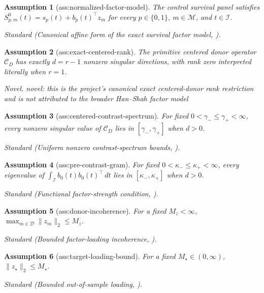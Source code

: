 \documentclass{article}
\newtheorem{assumption}{Assumption}
\begin{document}
\begin{assumption}[ass:normalized-factor-model]\label{ass:normalized-factor-model}
The control survival panel satisfies \(S^0_{p,m}(t)=s_p(t)+b_p(t)^\top z_m\) for every \(p\in\{0,1\}\), \(m\in\mathcal M\), and \(t\in\mathcal I\).
\par\smallskip\noindent\emph{Standard} (Canonical affine form of the exact survival factor model, \cite{HanShah2025SSC}).
\end{assumption}

\begin{assumption}[ass:exact-centered-rank]\label{ass:exact-centered-rank}
The primitive centered donor operator \(\mathcal C_D\) has exactly \(d=r-1\) nonzero singular directions, with rank zero interpreted literally when \(r=1\).
\par\smallskip\noindent\emph{Novel.} novel: this is the project's canonical exact centered-donor rank restriction and is not attributed to the broader Han--Shah factor model
\end{assumption}

\begin{assumption}[ass:centered-contrast-spectrum]\label{ass:centered-contrast-spectrum}
For fixed \(0<\gamma_-\le\gamma_+<\infty\), every nonzero singular value of \(\mathcal C_D\) lies in \([\gamma_-,\gamma_+]\) when \(d>0\).
\par\smallskip\noindent\emph{Standard} (Uniform nonzero contrast-spectrum bounds, \cite{AgarwalShahShen2025PCR}).
\end{assumption}

\begin{assumption}[ass:pre-contrast-gram]\label{ass:pre-contrast-gram}
For fixed \(0<\kappa_-\le\kappa_+<\infty\), every eigenvalue of \(\int_{\mathcal I}b_0(t)b_0(t)^\top\,dt\) lies in \([\kappa_-,\kappa_+]\) when \(d>0\).
\par\smallskip\noindent\emph{Standard} (Functional factor-strength condition, \cite{AgarwalShahShen2025PCR}).
\end{assumption}

\begin{assumption}[ass:donor-incoherence]\label{ass:donor-incoherence}
For a fixed \(M_z<\infty\), \(\max_{m\in\mathcal D}\|z_m\|_2\le M_z\).
\par\smallskip\noindent\emph{Standard} (Bounded factor-loading incoherence, \cite{AgarwalShahShen2025PCR}).
\end{assumption}

\begin{assumption}[ass:target-loading-bound]\label{ass:target-loading-bound}
For a fixed \(M_\star\in(0,\infty)\), \(\|z_\star\|_2\le M_\star\).
\par\smallskip\noindent\emph{Standard} (Bounded out-of-sample loading, \cite{AgarwalShahShen2025PCR}).
\end{assumption}
\end{document}
